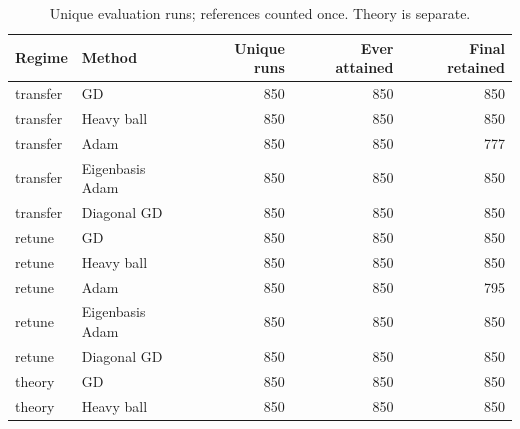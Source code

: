 \begin{table}[H]\centering\small
\begin{tabular}{llrrr}\toprule
Regime & Method & Unique runs & Ever attained & Final retained \\ \midrule
transfer & GD & 850 & 850 & 850 \\
transfer & Heavy ball & 850 & 850 & 850 \\
transfer & Adam & 850 & 850 & 777 \\
transfer & Eigenbasis Adam & 850 & 850 & 850 \\
transfer & Diagonal GD & 850 & 850 & 850 \\
retune & GD & 850 & 850 & 850 \\
retune & Heavy ball & 850 & 850 & 850 \\
retune & Adam & 850 & 850 & 795 \\
retune & Eigenbasis Adam & 850 & 850 & 850 \\
retune & Diagonal GD & 850 & 850 & 850 \\
theory & GD & 850 & 850 & 850 \\
theory & Heavy ball & 850 & 850 & 850 \\
\bottomrule\end{tabular}
\caption{Unique evaluation runs; references counted once. Theory is separate.}
\end{table}
